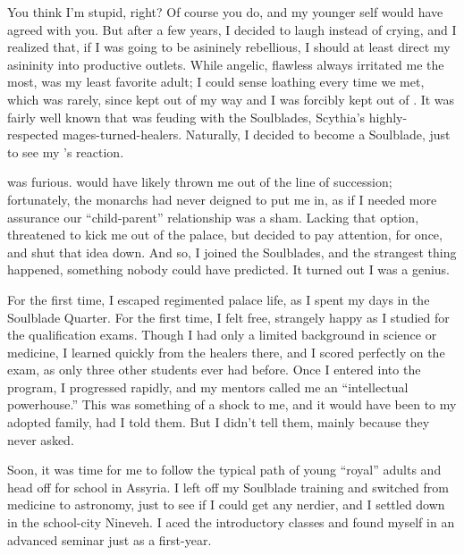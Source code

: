 \documentclass[char]{Kos}
\begin{document}
You think I'm stupid, right? Of course you do, and my younger self would have agreed with you. But after a few years, I decided to laugh instead of crying, and I realized that, if I was going to be asininely rebellious, I should at least direct my asininity into productive outlets. While angelic, flawless \cBride{} always irritated me the most, \cBride{\their} \cScythiaQueen{\parent} \cScythiaQueen{} was my least favorite adult; I could sense \cScythiaQueen{\their} loathing every time we met, which was rarely, since \cScythiaQueen{\they} kept out of my way and I was forcibly kept out of \cScythiaQueen{\theirs}. It was fairly well known that \cScythiaQueen{\they} was feuding with the Soulblades, Scythia's highly-respected mages-turned-healers. Naturally, I decided to become a Soulblade, just to see my \cScythiaQueen{\parent}'s reaction.

\cScythiaQueen{\They} was furious. \cScythiaQueen{\They} would have likely thrown me out of the line of succession; fortunately, the monarchs had never deigned to put me in, as if I needed more assurance our ``child-parent'' relationship was a sham. Lacking that option, \cScythiaQueen{\they} threatened to kick me out of the palace, but \cScythiaQueen{\their} \cScythiaKing{\spouse} decided to pay attention, for once, and shut that idea down. And so, I joined the Soulblades, and the strangest thing happened, something nobody could have predicted. It turned out I was a genius.

For the first time, I escaped regimented palace life, as I spent my days in the Soulblade Quarter. For the first time, I felt free, strangely happy as I studied for the qualification exams. Though I had only a limited background in science or medicine, I learned quickly from the healers there, and I scored perfectly on the exam, as only three other students ever had before. Once I entered into the program, I progressed rapidly, and my mentors called me an ``intellectual powerhouse.'' This was something of a shock to me, and it would have been to my adopted family, had I told them. But I didn't tell them, mainly because they never asked.

Soon, it was time for me to follow the typical path of young ``royal'' adults and head off for school in Assyria. I left off my Soulblade training and switched from medicine to astronomy, just to see if I could get any nerdier, and I settled down in the school-city Nineveh. I aced the introductory classes and found myself in an advanced seminar just as a first-year. 
\end{document}
